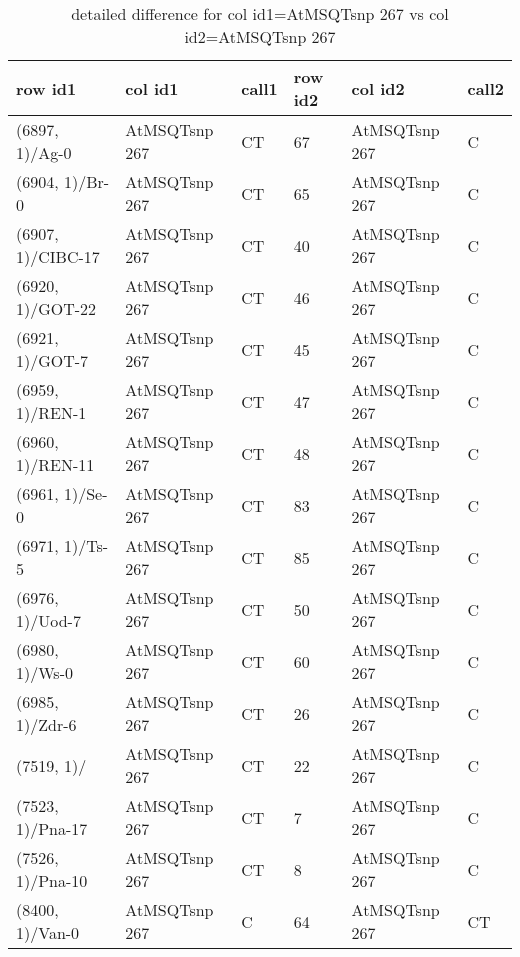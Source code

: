 \begin{center}
\begin{longtable}{|l|l|l|l|l|l|}
\caption{detailed difference for col id1=AtMSQTsnp 267 vs col id2=AtMSQTsnp 267} \label{table_dm813}\\
\hline
row id1&col id1&call1&row id2&col id2&call2\\
\hline
(6897, 1)/Ag-0&AtMSQTsnp 267&CT&67&AtMSQTsnp 267&C\\
(6904, 1)/Br-0&AtMSQTsnp 267&CT&65&AtMSQTsnp 267&C\\
(6907, 1)/CIBC-17&AtMSQTsnp 267&CT&40&AtMSQTsnp 267&C\\
(6920, 1)/GOT-22&AtMSQTsnp 267&CT&46&AtMSQTsnp 267&C\\
(6921, 1)/GOT-7&AtMSQTsnp 267&CT&45&AtMSQTsnp 267&C\\
(6959, 1)/REN-1&AtMSQTsnp 267&CT&47&AtMSQTsnp 267&C\\
(6960, 1)/REN-11&AtMSQTsnp 267&CT&48&AtMSQTsnp 267&C\\
(6961, 1)/Se-0&AtMSQTsnp 267&CT&83&AtMSQTsnp 267&C\\
(6971, 1)/Ts-5&AtMSQTsnp 267&CT&85&AtMSQTsnp 267&C\\
(6976, 1)/Uod-7&AtMSQTsnp 267&CT&50&AtMSQTsnp 267&C\\
(6980, 1)/Ws-0&AtMSQTsnp 267&CT&60&AtMSQTsnp 267&C\\
(6985, 1)/Zdr-6&AtMSQTsnp 267&CT&26&AtMSQTsnp 267&C\\
(7519, 1)/&AtMSQTsnp 267&CT&22&AtMSQTsnp 267&C\\
(7523, 1)/Pna-17&AtMSQTsnp 267&CT&7&AtMSQTsnp 267&C\\
(7526, 1)/Pna-10&AtMSQTsnp 267&CT&8&AtMSQTsnp 267&C\\
(8400, 1)/Van-0&AtMSQTsnp 267&C&64&AtMSQTsnp 267&CT\\
\hline
\end{longtable}
\end{center}


